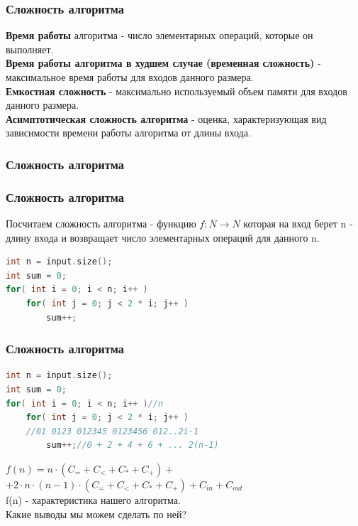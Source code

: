 \documentclass[russian, 12pt]{beamer}
\begin{document}
\begin{frame}
\frametitle{Сложность алгоритма}
\textbf{Время работы} алгоритма - 
число элементарных операций, которые он выполняет.\\[0.3cm]
\pause
\textbf{Время работы алгоритма в худшем случае (временная сложность)} - 
максимальное время работы для входов данного размера. \\[0.3cm]
\pause
\textbf{Емкостная сложность} - 
максимально используемый объем памяти для входов данного размера. \\[0.3cm]
\pause
\textbf{Асимптотическая сложность алгоритма} - 
оценка, характеризующая вид зависимости времени работы алгоритма от длины входа.

\end{frame}
\lstset{style=mystyle}
\begin{frame}
\frametitle{Сложность алгоритма}

\end{frame}
\lstset{style=mystyle}
\begin{frame}[fragile]
\frametitle{Сложность алгоритма}
Посчитаем сложность алгоритма - функцию $f: N\rightarrow N$ которая 
на вход берет n - длину входа и возвращает
число элементарных операций для данного n.\\[0.3cm]
\begin{lstlisting}[language=C++]
int n = input.size();
int sum = 0;
for( int i = 0; i < n; i++ )
    for( int j = 0; j < 2 * i; j++ )
        sum++; 
\end{lstlisting}
\end{frame}
\lstset{style=mystyle}
\begin{frame}[fragile]
\frametitle{Сложность алгоритма}
\begin{lstlisting}[language=C++]
int n = input.size();
int sum = 0;
for( int i = 0; i < n; i++ )//n
    for( int j = 0; j < 2 * i; j++ )
    //01 0123 012345 0123456 012..2i-1
        sum++;//0 + 2 + 4 + 6 + ... 2(n-1)  
\end{lstlisting}
$f(n) = n \cdot (C_= + C_< + C_* + C_+) +$\\
$ + 2\cdot n \cdot (n-1) \cdot (C_= + C_< + C_* + C_+) + C_{in} + C_{out}$\\[0.3cm]
f(n) - характеристика нашего алгоритма. \\
Какие выводы мы можем сделать по ней?
\end{frame}
\end{document}
